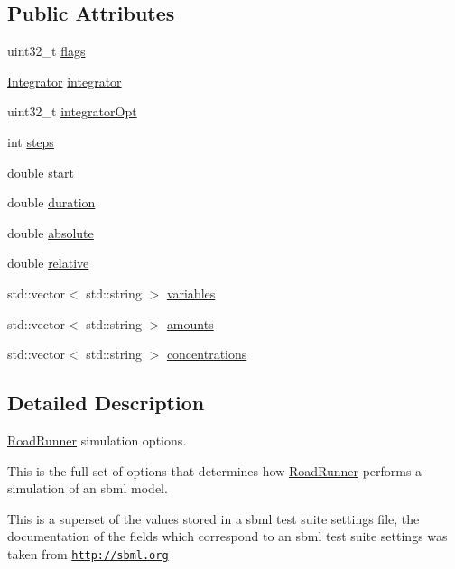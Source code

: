 \subsection*{Public Attributes}
\begin{DoxyCompactItemize}
\item 
uint32\-\_\-t \hyperlink{structrr_1_1_simulate_options_a3dfd51256f939804a2c8d7f2c72b1bbb}{flags}
\item 
\hyperlink{structrr_1_1_simulate_options_a9161fd2b138ff28e97491611dce61a52}{Integrator} \hyperlink{structrr_1_1_simulate_options_a21700122b4ef3ef310eed72c39a4804c}{integrator}
\item 
uint32\-\_\-t \hyperlink{structrr_1_1_simulate_options_a2a47baf7391cc689d36397ca51c5cc89}{integrator\-Opt}
\item 
int \hyperlink{structrr_1_1_simulate_options_a20008b16d84ef52a564648671d0c544b}{steps}
\item 
double \hyperlink{structrr_1_1_simulate_options_ae25c38171cedd08bf0cc43932c07822e}{start}
\item 
double \hyperlink{structrr_1_1_simulate_options_a6917a73a48307d38643923182b28b0c4}{duration}
\item 
double \hyperlink{structrr_1_1_simulate_options_a145102fab96b7452f7a8fae880c01353}{absolute}
\item 
double \hyperlink{structrr_1_1_simulate_options_ae51c0dd98194faf552b19dd3e3e39768}{relative}
\item 
std\-::vector$<$ std\-::string $>$ \hyperlink{structrr_1_1_simulate_options_a0953c07a719d03a4d558a9bf2ce16f83}{variables}
\item 
std\-::vector$<$ std\-::string $>$ \hyperlink{structrr_1_1_simulate_options_a13c457ced6a6396d9cb8dcecf42f0dee}{amounts}
\item 
std\-::vector$<$ std\-::string $>$ \hyperlink{structrr_1_1_simulate_options_a3fb8836610f52922ee371fdf06331e97}{concentrations}
\end{DoxyCompactItemize}


\subsection{Detailed Description}
\hyperlink{classrr_1_1_road_runner}{Road\-Runner} simulation options.

This is the full set of options that determines how \hyperlink{classrr_1_1_road_runner}{Road\-Runner} performs a simulation of an sbml model.

This is a superset of the values stored in a sbml test suite settings file, the documentation of the fields which correspond to an sbml test suite settings was taken from \href{http://sbml.org}{\tt http\-://sbml.\-org} 

